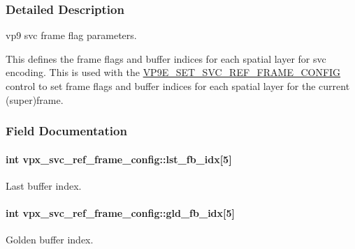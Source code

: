 \subsubsection{Detailed Description}
vp9 svc frame flag parameters. 

This defines the frame flags and buffer indices for each spatial layer for svc encoding. This is used with the \hyperlink{group__vp8__encoder_gga6deae3d561c838952552c3d3756322ecaa0d822d0d1efa1868ce05d8523a8836b}{V\+P9\+E\+\_\+\+S\+E\+T\+\_\+\+S\+V\+C\+\_\+\+R\+E\+F\+\_\+\+F\+R\+A\+M\+E\+\_\+\+C\+O\+N\+F\+IG} control to set frame flags and buffer indices for each spatial layer for the current (super)frame. 

\subsubsection{Field Documentation}
\paragraph[{\texorpdfstring{lst\+\_\+fb\+\_\+idx}{lst_fb_idx}}]{\setlength{\rightskip}{0pt plus 5cm}int vpx\+\_\+svc\+\_\+ref\+\_\+frame\+\_\+config\+::lst\+\_\+fb\+\_\+idx\mbox{[}5\mbox{]}}\hypertarget{structvpx__svc__ref__frame__config_a19b5483bc516fc83469d5967dc966783}{}\label{structvpx__svc__ref__frame__config_a19b5483bc516fc83469d5967dc966783}
Last buffer index. 
\paragraph[{\texorpdfstring{gld\+\_\+fb\+\_\+idx}{gld_fb_idx}}]{\setlength{\rightskip}{0pt plus 5cm}int vpx\+\_\+svc\+\_\+ref\+\_\+frame\+\_\+config\+::gld\+\_\+fb\+\_\+idx\mbox{[}5\mbox{]}}\hypertarget{structvpx__svc__ref__frame__config_a4af48b570c3262ad1d6fc7d436a7d5cc}{}\label{structvpx__svc__ref__frame__config_a4af48b570c3262ad1d6fc7d436a7d5cc}
Golden buffer index. 
